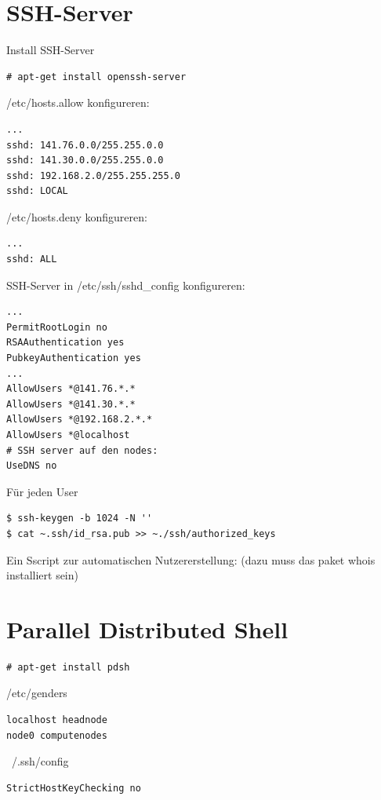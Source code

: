 \section{SSH-Server}
Install SSH-Server
\begin{lstlisting}[style=Bash]
# apt-get install openssh-server 
\end{lstlisting}


/etc/hosts.allow konfigureren:
\begin{lstlisting}[style=Bash]
...
sshd: 141.76.0.0/255.255.0.0
sshd: 141.30.0.0/255.255.0.0
sshd: 192.168.2.0/255.255.255.0
sshd: LOCAL 
\end{lstlisting}
/etc/hosts.deny konfigureren:
\begin{lstlisting}[style=Bash]
...
sshd: ALL
\end{lstlisting}

SSH-Server in /etc/ssh/sshd\_config konfigureren:
\begin{lstlisting}[style=Bash]
...
PermitRootLogin no
RSAAuthentication yes
PubkeyAuthentication yes
...
AllowUsers *@141.76.*.*
AllowUsers *@141.30.*.*
AllowUsers *@192.168.2.*.*
AllowUsers *@localhost
# SSH server auf den nodes:
UseDNS no
\end{lstlisting}

Für jeden User
\begin{lstlisting}[style=Bash]
$ ssh-keygen -b 1024 -N ''
$ cat ~.ssh/id_rsa.pub >> ~./ssh/authorized_keys
\end{lstlisting}

Ein Sscript zur automatischen Nutzererstellung:
(dazu muss das paket whois installiert sein)


\section{Parallel Distributed Shell}
\begin{lstlisting}[style=Bash]
# apt-get install pdsh
\end{lstlisting}
/etc/genders
\begin{lstlisting}[style=Bash]
localhost headnode
node0 computenodes
\end{lstlisting}
~/.ssh/config
\begin{lstlisting}[style=Bash]
StrictHostKeyChecking no
\end{lstlisting}
